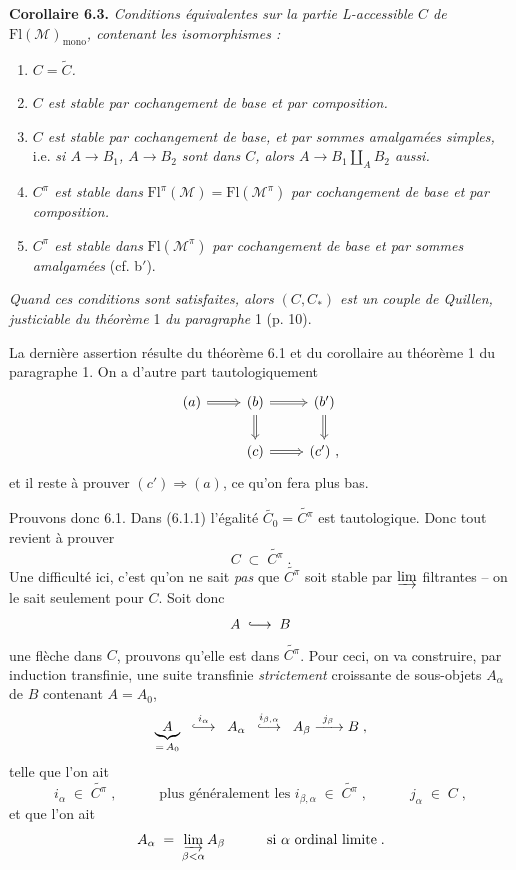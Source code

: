 \documentclass[11pt]{article}
\newcommand{\printedpage}[1]{\marginpar{\raggedright\footnotesize p.~#1}}
\newcommand{\msp}[1]{\marginpar{\raggedright\footnotesize [#1]}}
\newcommand{\Fl}{\mathrm{Fl}}
\newcommand{\into}{\lhook\joinrel\longrightarrow}
\begin{document}
\textbf{Corollaire 6.3.} \textit{Conditions équivalentes sur la partie L-accessible $C$ de} $\Fl(\mathcal{M})_{\mathrm{mono}}$\textit{, contenant les isomorphismes :}
\begin{enumerate}[label={}]
\item[a)] \textit{$C = \widetilde{C}$.}
\item[b)] \textit{$C$ est stable par cochangement de base et par composition.}
\item[b$'$)] \textit{$C$ est stable par cochangement de base, et par sommes amalgamées simples,} i.e. \textit{si $A \longrightarrow B_{1}$, $A \longrightarrow B_{2}$ sont dans $C$, alors $A \longrightarrow B_{1} \amalg_{A} B_{2}$ aussi.}
\item[c)] \textit{$C^{\pi}$ est stable dans} $\Fl^{\pi}(\mathcal{M}) = \Fl(\mathcal{M}^{\pi})$ \textit{par cochangement de base et par composition.}
\item[c$'$)] \textit{$C^{\pi}$ est stable dans} $\Fl(\mathcal{M}^{\pi})$ \textit{par cochangement de base et par sommes amalgamées} (cf. b$'$).
\end{enumerate}
\textit{Quand ces conditions sont satisfaites, alors $(C,C_{*})$ est un couple de Quillen, justiciable du théorème} 1 \textit{du paragraphe} 1 (p. 10).

La dernière assertion résulte du théorème 6.1 et du corollaire au théorème 1 du paragraphe 1. On a
\printedpage{43}%
\msp{page 78}
d'autre part tautologiquement
\[
\begin{tikzcd}
(a) \arrow[r, Rightarrow] & (b) \arrow[r, Rightarrow] \arrow[d, Rightarrow] & (b') \arrow[d, Rightarrow] \\
 & (c) \arrow[r, Rightarrow] & (c') \ ,
\end{tikzcd}
\]
et il reste à prouver $(c') \Longrightarrow (a)$, ce qu'on fera plus bas.

Prouvons donc 6.1. Dans (6.1.1) l'égalité $\widetilde{C_{0}} = \widetilde{C^{\pi}}$ est tautologique. Donc tout revient à prouver
\[
C \;\subset\; \widetilde{C^{\pi}} \; .
\]
Une difficulté ici, c'est qu'on ne sait \textit{pas} que $\widetilde{C^{\pi}}$ soit stable par $\varinjlim$ filtrantes -- on le sait seulement pour $C$. Soit donc
\[
A \;\into\; B
\]
une flèche dans $C$, prouvons qu'elle est dans $\widetilde{C^{\pi}}$. Pour ceci, on va construire, par induction transfinie, une suite transfinie \textit{strictement} croissante de sous-objets $A_{\alpha}$ de $B$ contenant $A = A_{0}$,
\[
\underbrace{A}_{=\,A_{0}} \;\; \overset{i_{\alpha}}{\into} \;\; A_{\alpha} \;\; \overset{i_{\beta,\alpha}}{\into} \;\; A_{\beta} \xrightarrow{\ j_{\beta}\ } B \; ,
\]
telle que l'on ait
\[
i_{\alpha} \;\in\; \widetilde{C^{\pi}} \; , \qquad\quad \text{plus généralement les } i_{\beta,\alpha} \;\in\; \widetilde{C^{\pi}} \; , \qquad\quad j_{\alpha} \;\in\; C \; ,
\]
et que l'on ait
\[
A_{\alpha} \;=\; \varinjlim_{\beta<\alpha} A_{\beta} \qquad\quad \text{si } \alpha \text{ ordinal limite} \; .
\]
\end{document}
